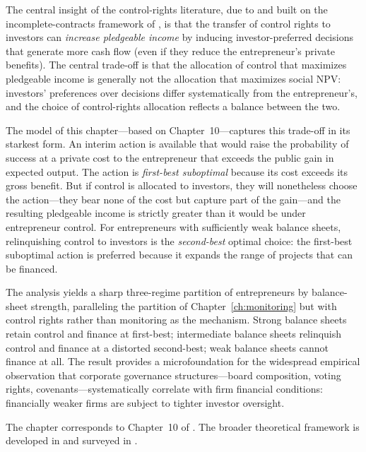 \documentclass[11pt,a4paper,oneside]{book}
\theoremstyle{plain}
\theoremstyle{definition}
\theoremstyle{remark}
\numberwithin{equation}{chapter}
\begin{document}
The central insight of the control-rights literature, due to \citet{AghionBolton1992} and built on the incomplete-contracts framework of \citet{HartMoore1990}, is that the transfer of control rights to investors can \emph{increase pledgeable income} by inducing investor-preferred decisions that generate more cash flow (even if they reduce the entrepreneur's private benefits).
The central trade-off is that the allocation of control that maximizes pledgeable income is generally not the allocation that maximizes social NPV: investors' preferences over decisions differ systematically from the entrepreneur's, and the choice of control-rights allocation reflects a balance between the two.

The model of this chapter---based on \citet{Tirole2006} Chapter~10---captures this trade-off in its starkest form.
An interim action is available that would raise the probability of success at a private cost to the entrepreneur that exceeds the public gain in expected output.
The action is \emph{first-best suboptimal} because its cost exceeds its gross benefit.
But if control is allocated to investors, they will nonetheless choose the action---they bear none of the cost but capture part of the gain---and the resulting pledgeable income is strictly greater than it would be under entrepreneur control.
For entrepreneurs with sufficiently weak balance sheets, relinquishing control to investors is the \emph{second-best} optimal choice: the first-best suboptimal action is preferred because it expands the range of projects that can be financed.

The analysis yields a sharp three-regime partition of entrepreneurs by balance-sheet strength, paralleling the partition of Chapter~\ref{ch:monitoring} but with control rights rather than monitoring as the mechanism.
Strong balance sheets retain control and finance at first-best; intermediate balance sheets relinquish control and finance at a distorted second-best; weak balance sheets cannot finance at all.
The result provides a microfoundation for the widespread empirical observation that corporate governance structures---board composition, voting rights, covenants---systematically correlate with firm financial conditions: financially weaker firms are subject to tighter investor oversight.

The chapter corresponds to Chapter~10 of \citet{Tirole2006}.
The broader theoretical framework is developed in \citet{Hart1995} and surveyed in \citet{Hart2001}.

\end{document}
